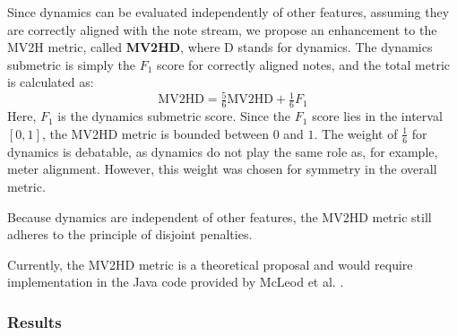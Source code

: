 Since dynamics can be evaluated independently of other features, assuming they are correctly aligned with the note stream, we propose an enhancement to the MV2H metric, called \textbf{MV2HD}, where D stands for dynamics. The dynamics submetric is simply the $F_1$ score for correctly aligned notes, and the total metric is calculated as: \[\textrm{MV2HD} = \tfrac{5}{6}\textrm{MV2HD} + \tfrac{1}{6}F_1\] Here, $F_1$ is the dynamics submetric score. Since the $F_1$ score lies in the interval $[0, 1]$, the MV2HD metric is bounded between $0$ and $1$. The weight of $\tfrac{1}{6}$ for dynamics is debatable, as dynamics do not play the same role as, for example, meter alignment. However, this weight was chosen for symmetry in the overall metric.

Because dynamics are independent of other features, the MV2HD metric still adheres to the principle of disjoint penalties.

Currently, the MV2HD metric is a theoretical proposal and would require implementation in the Java code provided by McLeod et al. \cite{McLeod2019}.

\subsubsection{Results}

\missing